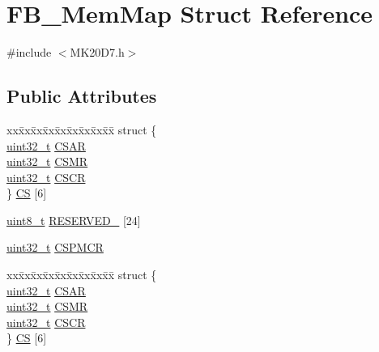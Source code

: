 \hypertarget{struct_f_b___mem_map}{}\section{F\+B\+\_\+\+Mem\+Map Struct Reference}
\label{struct_f_b___mem_map}


{\ttfamily \#include $<$M\+K20\+D7.\+h$>$}

\subsection*{Public Attributes}
\begin{DoxyCompactItemize}
\item 
\begin{tabbing}
xx\=xx\=xx\=xx\=xx\=xx\=xx\=xx\=xx\=\kill
struct \{\\
\>\hyperlink{_p_e___types_8h_a33594304e786b158f3fb30289278f5af}{uint32\_t} \hyperlink{struct_f_b___mem_map_aa59ea1aff2f195dc7d41ef8611884381}{CSAR}\\
\>\hyperlink{_p_e___types_8h_a33594304e786b158f3fb30289278f5af}{uint32\_t} \hyperlink{struct_f_b___mem_map_a02c1e1542339e83d168a52e763f60228}{CSMR}\\
\>\hyperlink{_p_e___types_8h_a33594304e786b158f3fb30289278f5af}{uint32\_t} \hyperlink{struct_f_b___mem_map_a7a1e48a5fde6382a076243009f5c0846}{CSCR}\\
\} \hyperlink{struct_f_b___mem_map_a4391acbc12cf84dd0dd3926949ac7976}{CS} \mbox{[}6\mbox{]}\\

\end{tabbing}\item 
\hyperlink{_p_e___types_8h_aba7bc1797add20fe3efdf37ced1182c5}{uint8\+\_\+t} \hyperlink{struct_f_b___mem_map_a16a3f61c174bd6978f483ee0de4e9240}{R\+E\+S\+E\+R\+V\+E\+D\+\_} \mbox{[}24\mbox{]}
\item 
\hyperlink{_p_e___types_8h_a33594304e786b158f3fb30289278f5af}{uint32\+\_\+t} \hyperlink{struct_f_b___mem_map_a7876f1f5e2d0718968b09242af73b600}{C\+S\+P\+M\+CR}
\item 
\begin{tabbing}
xx\=xx\=xx\=xx\=xx\=xx\=xx\=xx\=xx\=\kill
struct \{\\
\>\hyperlink{_p_e___types_8h_a33594304e786b158f3fb30289278f5af}{uint32\_t} \hyperlink{struct_f_b___mem_map_aa59ea1aff2f195dc7d41ef8611884381}{CSAR}\\
\>\hyperlink{_p_e___types_8h_a33594304e786b158f3fb30289278f5af}{uint32\_t} \hyperlink{struct_f_b___mem_map_a02c1e1542339e83d168a52e763f60228}{CSMR}\\
\>\hyperlink{_p_e___types_8h_a33594304e786b158f3fb30289278f5af}{uint32\_t} \hyperlink{struct_f_b___mem_map_a7a1e48a5fde6382a076243009f5c0846}{CSCR}\\
\} \hyperlink{struct_f_b___mem_map_a070743eac7a6b7f9fdcdfeac7b1d543e}{CS} \mbox{[}6\mbox{]}\\


\end{tabbing}
\end{DoxyCompactItemize}
